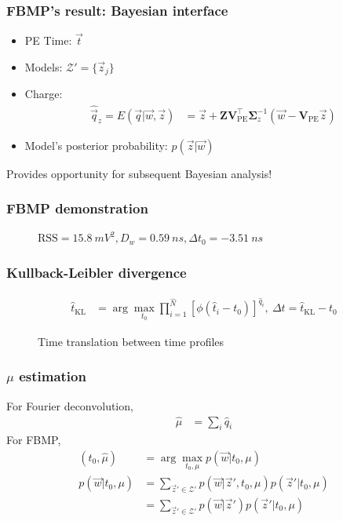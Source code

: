 \documentclass{beamer}
\begin{document}
\begin{CJK*}{UTF8}{gbsn}
\begin{frame}
\frametitle{FBMP's result: Bayesian interface}
\begin{itemize}
    \item PE Time: $\vec{t}$
    \item Models: $\mathcal{Z}'=\{\vec{z}_j\}$
    \item Charge: \begin{align*}
        \hat{\vec{q}}_z = E(\vec{q}|\vec{w},\vec{z}) &= \vec{z} + \bm{Z}\bm{V}_\mathrm{PE}^\intercal\bm{\Sigma}_z^{-1}(\vec{w}-\bm{V}_\mathrm{PE}\vec{z})
        \end{align*}
    \item Model's posterior probability: $p(\vec{z}|\vec{w})$
\end{itemize}
\begin{center}
    Provides opportunity for subsequent Bayesian analysis! 
\end{center}
\end{frame}

\begin{frame}
\frametitle{FBMP demonstration}
\begin{figure}
    \centering
    \resizebox{0.6\textwidth}{!}{}
    \caption{$\mathrm{RSS}=\SI{15.8}{mV^2},D_w=\SI{0.59}{ns},\Delta t_0=\SI{-3.51}{ns}$}
\end{figure}
\end{frame}

\begin{frame}
\frametitle{Kullback-Leibler divergence}
\begin{align*}
  \hat{t}_\mathrm{KL} &= \arg\underset{t_0}{\max} \prod_{i=1}^{\hat{N}} \left[\phi(\hat{t}_i-t_0)\right]^{\hat{q}_i} ,\ \Delta t = \hat{t}_\mathrm{KL} - t_0
\end{align*}
\begin{figure}
    \centering
    \resizebox{0.6\textwidth}{!}{}
    \caption{Time translation between time profiles}
\end{figure}
\end{frame}

\begin{frame}
\frametitle{$\mu$ estimation}
For Fourier deconvolution, 
\begin{align*}
    \hat{\mu} &= \sum_i \hat{q}_i
\end{align*}
For FBMP,
\begin{align*}
    \left(\hat{t}_0, \hat{\mu}\right) &= \arg\underset{t_0,\mu}{\max} p(\vec{w} | t_0, \mu) \\
    p(\vec{w}|t_0, \mu) &= \sum_{\vec{z}'\in\mathcal{Z}'}p(\vec{w}|\vec{z}',t_0,\mu)p(\vec{z}'|t_0,\mu) \\
    &= \sum_{\vec{z}'\in\mathcal{Z}'}p(\vec{w}|\vec{z}')p(\vec{z}'|t_0,\mu)
\end{align*}
\end{frame}


\end{CJK*}
\end{document}
